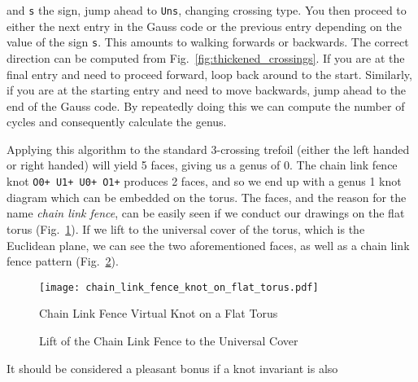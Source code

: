         and \texttt{s} the sign, jump ahead to \texttt{Uns}, changing crossing
        type. You then proceed to either the next entry in the Gauss code or
        the previous entry depending on the value of the sign \texttt{s}.
        This amounts to walking forwards or backwards. The correct direction
        can be computed from Fig.~\ref{fig:thickened_crossings}. If you are at
        the final entry and need to proceed forward, loop back around to the
        start. Similarly, if you are at the starting entry and need to move
        backwards, jump ahead to the end of the Gauss code. By repeatedly
        doing this we can compute the number of cycles and consequently
        calculate the genus.
        \par\hfill\par
        Applying this algorithm to the standard 3-crossing trefoil (either the
        left handed or right handed) will yield 5 faces, giving us a genus of
        0. The chain link fence knot \texttt{O0+ U1+ U0+ O1+} produces 2 faces,
        and so we end up with a genus 1 knot diagram which can be embedded on
        the torus. The faces, and the reason for the name
        \textit{chain link fence}, can be easily seen if we conduct our drawings
        on the flat torus (Fig.~\ref{fig:chain_link_fence_knot_on_flat_torus}).
        If we lift to the universal cover of the torus, which is the Euclidean
        plane, we can see the two aforementioned faces, as well as a chain
        link fence pattern
        (Fig.~\ref{fig:chain_link_fence_knot_on_flat_torus_universal_cover}).
        \begin{figure}
            \centering
            \texttt{[image: chain\_link\_fence\_knot\_on\_flat\_torus.pdf]}
            \caption{Chain Link Fence Virtual Knot on a Flat Torus}
            \label{fig:chain_link_fence_knot_on_flat_torus}
        \end{figure}
        \begin{figure}
            \centering
            \caption{Lift of the Chain Link Fence to the Universal Cover}
            \label{fig:chain_link_fence_knot_on_flat_torus_universal_cover}
        \end{figure}
        \par\hfill\par
        It should be considered a pleasant bonus if a knot invariant is also
